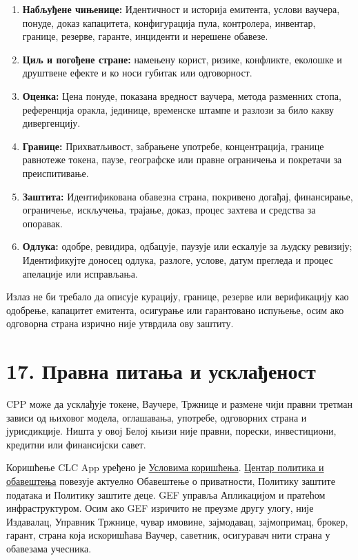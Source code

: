 \documentclass[11pt]{article}
\begin{document}
\begin{enumerate}[leftmargin=*]
\item \textbf{Набљуђене чињенице:} Идентичност и историја емитента, услови ваучера, понуде, доказ капацитета, конфигурација пула, контролера, инвентар, границе, резерве, гаранте, инциденти и нерешене обавезе.
\item \textbf{Циљ и погођене стране:} намењену корист, ризике, конфликте, еколошке и друштвене ефекте и ко носи губитак или одговорност.
\item \textbf{Оценка:} Цена понуде, показана вредност ваучера, метода разменних стопа, референција оракла, јединице, временске штампе и разлози за било какву дивергенцију.
\item \textbf{Границе:} Прихватљивост, забрањене употребе, концентрација, границе равнотеже токена, паузе, географске или правне ограничења и покретачи за преиспитивање.
\item \textbf{Заштита:} Идентификована обавезна страна, покривено догађај, финансирање, ограничење, искључења, трајање, доказ, процес захтева и средства за опоравак.
\item \textbf{Одлука:} одобре, ревидира, одбацује, паузује или ескалује за људску ревизију; Идентификујте доносец одлука, разлоге, услове, датум прегледа и процес апелације или исправљања.
\end{enumerate}
Излаз не би требало да описује курацију, границе, резерве или верификацију као одобрење, капацитет емитента, осигурање или гарантовано испуњење, осим ако одговорна страна изрично није утврдила ову заштиту.


\section*{17. Правна питања и усклађеност}

CPP може да усклађује токене, Ваучере, Тржнице и размене чији правни третман зависи од њиховог модела, оглашавања, употребе, одговорних страна и јурисдикције. Ништа у овој Белој књизи није правни, порески, инвестициони, кредитни или финансијски савет.

Коришћење CLC App уређено је \href{https://docs.cosmolocal.credit/sr/governance/terms}{Условима коришћења}. \href{https://docs.cosmolocal.credit/sr/governance/policies}{Центар политика и обавештења} повезује актуелно Обавештење о приватности, Политику заштите података и Политику заштите деце. GEF управља Апликацијом и пратећом инфраструктуром. Осим ако GEF изричито не преузме другу улогу, није Издавалац, Управник Тржнице, чувар имовине, зајмодавац, зајмопримац, брокер, гарант, страна која искоришћава Ваучер, саветник, осигуравач нити страна у обавезама учесника.
\end{document}
